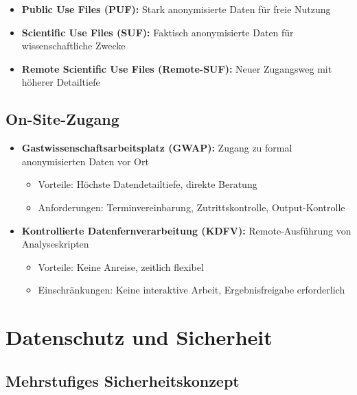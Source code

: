 \documentclass[
  ngerman,
  10pt,
  letterpaper,
  twocolumn]{book}
\providecommand{\tightlist}{%
  \setlength{\itemsep}{0pt}\setlength{\parskip}{0pt}}
\begin{document}
\begin{itemize}
\tightlist
\item
  \textbf{Public Use Files (PUF):} Stark anonymisierte Daten für freie
  Nutzung
\item
  \textbf{Scientific Use Files (SUF):} Faktisch anonymisierte Daten für
  wissenschaftliche Zwecke
\item
  \textbf{Remote Scientific Use Files (Remote-SUF):} Neuer Zugangsweg
  mit höherer Detailtiefe
\end{itemize}

\subsection{On-Site-Zugang}\label{on-site-zugang}

\begin{itemize}
\tightlist
\item
  \textbf{Gastwissenschaftsarbeitsplatz (GWAP):} Zugang zu formal
  anonymisierten Daten vor Ort

  \begin{itemize}
  \tightlist
  \item
    Vorteile: Höchste Datendetailtiefe, direkte Beratung
  \item
    Anforderungen: Terminvereinbarung, Zutrittskontrolle,
    Output-Kontrolle
  \end{itemize}
\item
  \textbf{Kontrollierte Datenfernverarbeitung (KDFV):} Remote-Ausführung
  von Analyseskripten

  \begin{itemize}
  \tightlist
  \item
    Vorteile: Keine Anreise, zeitlich flexibel
  \item
    Einschränkungen: Keine interaktive Arbeit, Ergebnisfreigabe
    erforderlich
  \end{itemize}
\end{itemize}

\section{Datenschutz und Sicherheit}\label{datenschutz-und-sicherheit}

\subsection{Mehrstufiges
Sicherheitskonzept}\label{mehrstufiges-sicherheitskonzept}
\end{document}
